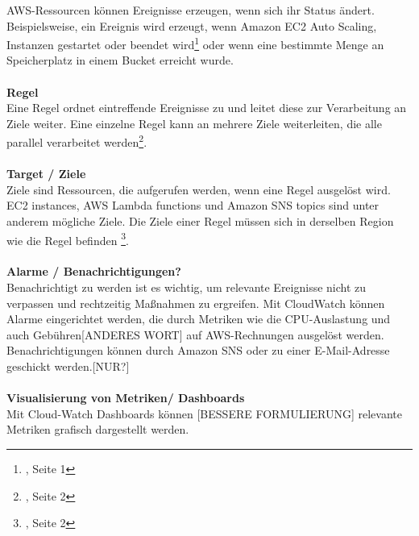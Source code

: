 AWS-Ressourcen können Ereignisse erzeugen, wenn sich ihr Status ändert.
Beispielsweise, ein Ereignis wird erzeugt, wenn Amazon EC2 Auto Scaling, Instanzen gestartet oder beendet wird\footnote{\cite{AMZ13}, Seite 1} oder wenn eine bestimmte Menge an Speicherplatz in einem Bucket erreicht wurde.
\\\\
\textbf{Regel} \\
Eine Regel ordnet eintreffende Ereignisse zu und leitet diese zur Verarbeitung an Ziele weiter.
Eine einzelne Regel kann an mehrere Ziele weiterleiten, die alle parallel verarbeitet werden\footnote{\cite{AMZ13}, Seite 2}.
\\\\
\textbf{Target / Ziele} \\
Ziele sind Ressourcen, die aufgerufen werden, wenn eine Regel ausgelöst wird.
EC2 instances, AWS Lambda functions und Amazon SNS topics sind unter anderem mögliche Ziele.
Die Ziele einer Regel müssen sich in derselben Region wie die Regel befinden
\footnote{\cite{AMZ13}, Seite 2}.
\\\\
\textbf{Alarme / Benachrichtigungen?}\\
Benachrichtigt zu werden ist es wichtig, um relevante Ereignisse nicht zu verpassen und rechtzeitig Maßnahmen zu ergreifen. Mit CloudWatch können Alarme eingerichtet werden, die durch Metriken wie die CPU-Auslastung und auch Gebühren[ANDERES WORT] auf AWS-Rechnungen ausgelöst werden.
Benachrichtigungen können durch Amazon SNS oder zu einer E-Mail-Adresse geschickt werden.[NUR?]
\\\\
\textbf{Visualisierung von Metriken/ Dashboards}\\
Mit Cloud-Watch Dashboards können [BESSERE FORMULIERUNG] relevante Metriken grafisch dargestellt werden. %
